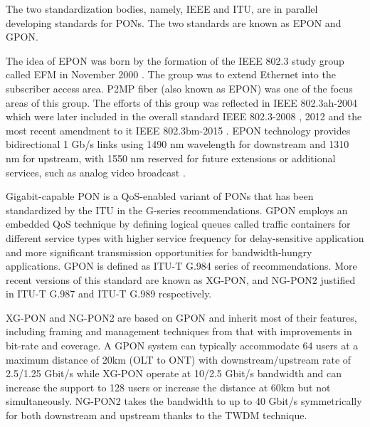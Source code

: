 The two standardization bodies, namely, \ac{IEEE} and \ac{ITU}, are in parallel developing standards for \acp{PON}. The two standards are known as \ac{EPON} and \ac{GPON}.





The idea of \ac{EPON} was born by the formation of the \ac{IEEE} 802.3 study group called \ac{EFM} in November 2000 \cite{879000}. The group was to extend Ethernet into the subscriber access area. \ac{P2MP} fiber (also known as \ac{EPON}) was one of the focus areas of this group. The efforts of this group was reflected in \ac{IEEE} 802.3ah-2004 \cite{1337489} which were later included in the overall standard \ac{IEEE} 802.3-2008 \cite{4726971}, 2012 \cite{6419735} and the most recent amendment to it \ac{IEEE} 802.3bm-2015 \cite{7069180}.
\ac{EPON} technology provides bidirectional 1 Gb/s links using 1490 nm wavelength for downstream and 1310 nm for upstream, with 1550 nm reserved for future extensions or additional services, such as analog video broadcast \cite{4150568}.

Gigabit-capable \ac{PON} is a \ac{QoS}-enabled variant of \acp{PON} that has been standardized by the \ac{ITU} in the G-series recommendations. \ac{GPON} employs an embedded \ac{QoS} technique by defining logical queues called traffic containers for different service types with higher service frequency for delay-sensitive application and more significant transmission opportunities for bandwidth-hungry applications. \ac{GPON} is defined as ITU-T G.984 \cite{itu984} series of recommendations. More recent versions of this standard are known as \ac{XG-PON}, and \ac{NG-PON2} justified in ITU-T G.987 \cite{itu987} and ITU-T G.989 \cite{itu989} respectively.

\ac{XG-PON} and \ac{NG-PON2} are based on \ac{GPON} and inherit most of their features, including framing and management techniques from that with improvements in bit-rate and coverage. A \ac{GPON} system can typically accommodate 64 users at a maximum distance of 20km (OLT to ONT) with downstream/upstream rate of 2.5/1.25 Gbit/s while \ac{XG-PON} operate at 10/2.5 Gbit/s bandwidth and can increase the support to 128 users or increase the distance at 60km but not simultaneously. \ac{NG-PON2} takes the bandwidth to up to 40 Gbit/s symmetrically for both downstream and upstream thanks to the TWDM technique.


